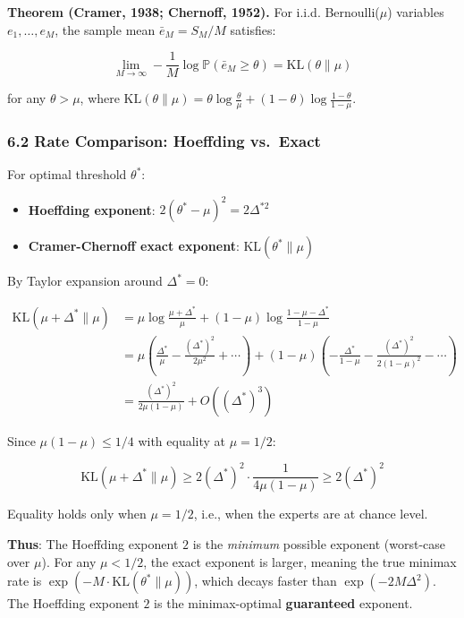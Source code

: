 \documentclass[
  12pt,
]{article}
\providecommand{\tightlist}{%
  \setlength{\itemsep}{0pt}\setlength{\parskip}{0pt}}
\begin{document}
\textbf{Theorem (Cramer, 1938; Chernoff, 1952).} For i.i.d.
Bernoulli(\(\mu\)) variables \(e_1,\dots,e_M\), the sample mean
\(\bar{e}_M = S_M/M\) satisfies:

\[\lim_{M \to \infty} -\frac{1}{M} \log \mathbb{P}(\bar{e}_M \geq \theta) = \text{KL}(\theta \parallel \mu)\]

for any \(\theta > \mu\), where
\(\text{KL}(\theta \parallel \mu) = \theta\log\frac{\theta}{\mu} + (1-\theta)\log\frac{1-\theta}{1-\mu}\).

\subsubsection{6.2 Rate Comparison: Hoeffding
vs.~Exact}\label{rate-comparison-hoeffding-vs.-exact}

For optimal threshold \(\theta^*\):

\begin{itemize}
\tightlist
\item
  \textbf{Hoeffding exponent}: \(2(\theta^* - \mu)^2 = 2\Delta^{*2}\)
\item
  \textbf{Cramer-Chernoff exact exponent}:
  \(\text{KL}(\theta^* \parallel \mu)\)
\end{itemize}

By Taylor expansion around \(\Delta^* = 0\):

\[\begin{aligned}
\text{KL}(\mu + \Delta^* \parallel \mu) &= \mu\log\frac{\mu+\Delta^*}{\mu} + (1-\mu)\log\frac{1-\mu-\Delta^*}{1-\mu} \\
&= \mu\left(\frac{\Delta^*}{\mu} - \frac{(\Delta^*)^2}{2\mu^2} + \cdots\right) + (1-\mu)\left(-\frac{\Delta^*}{1-\mu} - \frac{(\Delta^*)^2}{2(1-\mu)^2} - \cdots\right) \\
&= \frac{(\Delta^*)^2}{2\mu(1-\mu)} + O((\Delta^*)^3)
\end{aligned}\]

Since \(\mu(1-\mu) \leq 1/4\) with equality at \(\mu = 1/2\):

\[\text{KL}(\mu+\Delta^* \parallel \mu) \geq 2(\Delta^*)^2 \cdot \frac{1}{4\mu(1-\mu)} \geq 2(\Delta^*)^2\]

Equality holds only when \(\mu = 1/2\), i.e., when the experts are at
chance level.

\textbf{Thus}: The Hoeffding exponent \(2\) is the \emph{minimum}
possible exponent (worst-case over \(\mu\)). For any \(\mu < 1/2\), the
exact exponent is larger, meaning the true minimax rate is
\(\exp(-M \cdot \text{KL}(\theta^* \parallel \mu))\), which decays
faster than \(\exp(-2M\Delta^2)\). The Hoeffding exponent \(2\) is the
minimax-optimal \textbf{guaranteed} exponent.
\end{document}
